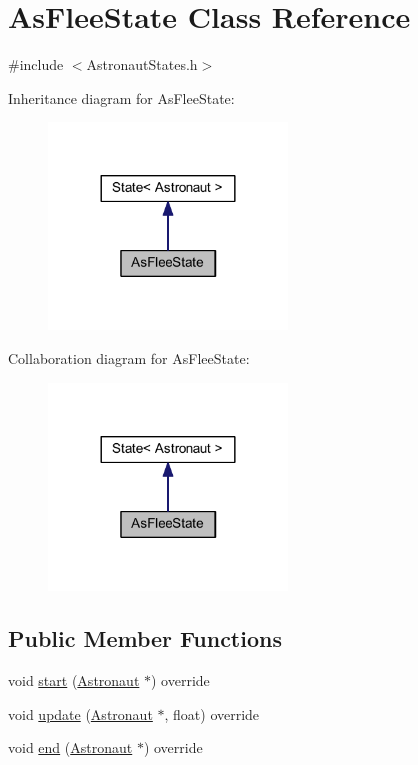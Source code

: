 \hypertarget{class_as_flee_state}{}\section{As\+Flee\+State Class Reference}
\label{class_as_flee_state}


{\ttfamily \#include $<$Astronaut\+States.\+h$>$}



Inheritance diagram for As\+Flee\+State\+:
\nopagebreak
\begin{figure}[H]
\begin{center}
\leavevmode
\includegraphics[width=180pt]{class_as_flee_state__inherit__graph}
\end{center}
\end{figure}


Collaboration diagram for As\+Flee\+State\+:
\nopagebreak
\begin{figure}[H]
\begin{center}
\leavevmode
\includegraphics[width=180pt]{class_as_flee_state__coll__graph}
\end{center}
\end{figure}
\subsection*{Public Member Functions}
\begin{DoxyCompactItemize}
\item 
void \hyperlink{class_as_flee_state_a73dfdf7af46e5bce0b212030413cd00c}{start} (\hyperlink{class_astronaut}{Astronaut} $\ast$) override
\item 
void \hyperlink{class_as_flee_state_a2a6af75f427daa36c6e480f531e783ee}{update} (\hyperlink{class_astronaut}{Astronaut} $\ast$, float) override
\item 
void \hyperlink{class_as_flee_state_a58912e7f5eed181065942f81d2e4e22a}{end} (\hyperlink{class_astronaut}{Astronaut} $\ast$) override
\end{DoxyCompactItemize}
